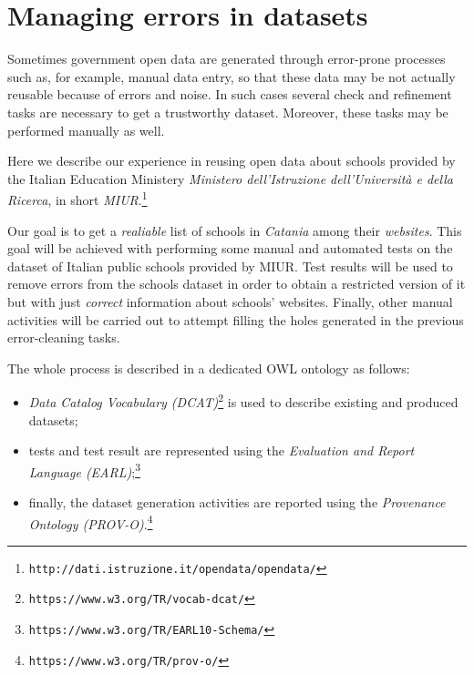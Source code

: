 \documentclass{article}
\begin{document}
\section{Managing errors in datasets}

Sometimes government open data are generated through error-prone processes such as, for example, 
manual data entry, so that these data may be not actually reusable because of errors and noise. In such cases 
several check and refinement tasks are necessary to get a trustworthy dataset. Moreover, these tasks
may be performed manually as well. 

Here we describe our experience in reusing open data about schools provided by the Italian Education Ministery 
\emph{Ministero dell'Istruzione dell'Universit\`a e della Ricerca}, in short \emph{MIUR}.\footnote{\texttt{http://dati.istruzione.it/opendata/opendata/}}

Our goal is to get a \emph{realiable} list of schools in \emph{Catania} 
among their \emph{websites}. This goal will be achieved with performing some manual and automated tests on
the dataset of Italian public schools provided by MIUR. Test results will be used to remove errors from the schools
dataset in order to obtain a restricted version of it but with just \emph{correct} information about schools' websites. 
Finally, other manual activities will be carried out to attempt filling the holes generated in the previous error-cleaning tasks.

The whole process is described in a dedicated OWL ontology as follows:
\begin{itemize}
	\item \emph{Data Catalog Vocabulary (DCAT)}\footnote{\texttt{https://www.w3.org/TR/vocab-dcat/}} is used to describe existing and produced datasets; 
	\item tests and test result are represented using the \emph{Evaluation and Report Language (EARL)};\footnote{\texttt{https://www.w3.org/TR/EARL10-Schema/}} 
	\item finally, the dataset generation activities are reported using the \emph{Provenance Ontology (PROV-O)}.\footnote{\texttt{https://www.w3.org/TR/prov-o/}}
\end{itemize}
\end{document}
